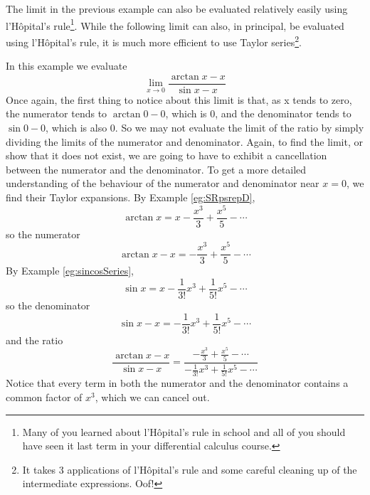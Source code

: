 The limit in the previous example can also be evaluated relatively easily using l'H\^opital's rule\footnote{Many of you
learned about l'H\^opital's rule in school and all of you should have seen it last term in your differential calculus
course.}. While the following limit can also, in principal, be evaluated using l'H\^opital's rule, it is much more
efficient to use Taylor series\footnote{It takes 3 applications of l'H\^opital's rule and some careful cleaning up of
the intermediate expressions. Oof!}.

\begin{eg}\label{eg:TaylorlimitB}
In this example we evaluate
\begin{equation*}
\lim_{x\rightarrow 0}\frac{\arctan x -x}{\sin x-x}
\end{equation*}
Once again, the first thing to notice about this limit is that,
as x tends to zero, the numerator tends to $\arctan 0 -0$, which
is $0$, and the denominator tends to $\sin 0-0$, which is also
$0$. So we may not evaluate the limit of the ratio by
simply dividing the limits of the numerator and denominator.
Again, to find the limit, or show that it does not exist,
we are going to have to exhibit a cancellation between the
numerator and the denominator. To get a more detailed
understanding of the behaviour of the numerator and denominator
near $x=0$, we find their Taylor expansions. By Example \ref{eg:SRpsrepD},
\begin{equation*}
\arctan x = x-\frac{x^3}{3}+\frac{x^5}{5}-\cdots
\end{equation*}
so the numerator
\begin{equation*}
\arctan x -x = -\frac{x^3}{3}+\frac{x^5}{5}-\cdots
\end{equation*}
By Example \ref{eg:sincosSeries},
\begin{equation*}
\sin x = x-\frac{1}{3!}x^3+\frac{1}{5!}x^5 - \cdots
\end{equation*}
so the denominator
\begin{equation*}
\sin x -x = -\frac{1}{3!}x^3+\frac{1}{5!}x^5 - \cdots
\end{equation*}
and the ratio
\begin{equation*}
\frac{\arctan x -x}{\sin x - x}
= \frac{-\frac{x^3}{3}+\frac{x^5}{5}-\cdots}
       {-\frac{1}{3!}x^3+\frac{1}{5!}x^5 - \cdots}
\end{equation*}
Notice that every term in both the numerator and the denominator
contains a common factor of $x^3$, which we can cancel out.
\begin{equation*}

\end{equation*}
\end{eg}
